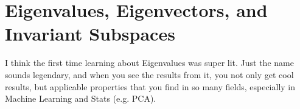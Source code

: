 \chapter{Eigenvalues, Eigenvectors, and Invariant Subspaces}

I think the first time learning about Eigenvalues was super lit.
Just the name sounds legendary, and when you see the results from it, you not only get cool results, but applicable properties that you find in so many fields, especially in Machine Learning and Stats (e.g. PCA).


